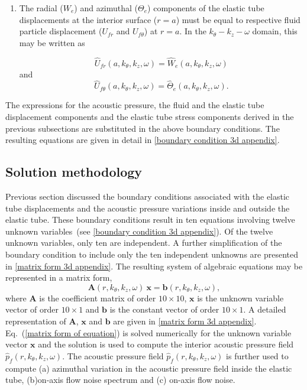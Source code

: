 \documentclass[twocolumn,10pt]{asme2ej}
\begin{document}
\begin{enumerate}
     \item The radial ($W_e$) and azimuthal ($\Theta_e$) components of the elastic tube displacements at the interior surface ($r=a$) must be equal to respective fluid particle displacement ($U_{fr}$ and $U_{f\theta}$) at $r=a$. In the $k_\theta-k_z-\omega$ domain, this may be written as

     \begin{equation}\label{BC9 3d}
        \hat{U}_{fr}(a,k_\theta,k_{z},\omega) = \hat{W}_{e}(a,k_\theta,k_{z},\omega) 
    \end{equation}
    and
    \begin{equation}\label{BC10 3d}
        \hat{U}_{f\theta}(a,k_\theta,k_{z},\omega) = \hat{\Theta}_{e}(a,k_\theta,k_{z},\omega).
    \end{equation}
    \end{enumerate}
The expressions for the acoustic pressure, the fluid and the elastic tube displacement components and the elastic tube stress components derived in the previous subsections are substituted in the above boundary conditions. The resulting equations are given in detail in \ref{boundary condition 3d appendix}.

\subsection{Solution methodology}\label{solution methods}
Previous section discussed the boundary conditions associated with the elastic tube displacements and the acoustic pressure variations inside and outside the elastic tube. These boundary conditions result in ten equations involving twelve unknown variables~(see \ref{boundary condition 3d appendix}). Of the twelve unknown variables, only ten are independent. A further simplification of the boundary condition to include only the ten independent unknowns are presented in \ref{matrix form 3d appendix}. The resulting system of algebraic equations may be represented in a matrix form,
\begin{equation}\label{matrix form of equation}
    \mathbf{A}(r,k_\theta,k_z,\omega)~\mathbf{x} = \mathbf{b}(r,k_\theta,k_z,\omega),   
\end{equation}
where $\mathbf{A}$ is the coefficient matrix of order $10\times10$, $\mathbf{x}$ is the unknown variable vector of order $10\times1$ and $\mathbf{b}$ is the constant vector of order $10\times1$. A detailed representation of $\mathbf{A}$, $\mathbf{x}$ and $\mathbf{b}$ are given in \ref{matrix form 3d appendix}. Eq.~(\ref{matrix form of equation}) is solved numerically for the unknown variable vector $\mathbf{x}$ and the solution is used to compute the interior acoustic pressure field $\hat{p}_f(r,k_\theta,k_z,\omega)$. The acoustic pressure field $\hat{p}_f(r,k_\theta,k_z,\omega)$ is further used to compute (a) azimuthal variation in the acoustic pressure field inside the elastic tube, (b)on-axis flow noise spectrum and (c) on-axis flow noise.
\end{document}
